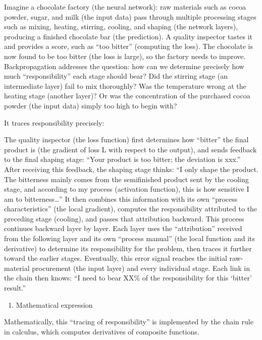 Imagine a chocolate factory (the neural network): raw materials such as cocoa powder, sugar, and milk (the input data) pass through multiple processing stages such as mixing, heating, stirring, cooling, and shaping (the network layers), producing a finished chocolate bar (the prediction). A quality inspector tastes it and provides a score, such as ``too bitter'' (computing the loss). The chocolate is now found to be too bitter (the loss is large), so the factory needs to improve. Backpropagation addresses the question: how can we determine precisely how much ``responsibility'' each stage should bear? Did the stirring stage (an intermediate layer) fail to mix thoroughly? Was the temperature wrong at the heating stage (another layer)? Or was the concentration of the purchased cocoa powder (the input data) simply too high to begin with?

It traces responsibility precisely:

The quality inspector (the loss function) first determines how ``bitter'' the final product is (the gradient of loss L with respect to the output), and sends feedback to the final shaping stage: ``Your product is too bitter; the deviation is xxx.'' After receiving this feedback, the shaping stage thinks: ``I only shape the product. The bitterness mainly comes from the semifinished product sent by the cooling stage, and according to my process (activation function), this is how sensitive I am to bitterness\ldots{}'' It then combines this information with its own ``process characteristics'' (the local gradient), computes the responsibility attributed to the preceding stage (cooling), and passes that attribution backward. This process continues backward layer by layer. Each layer uses the ``attribution'' received from the following layer and its own ``process manual'' (the local function and its derivative) to determine its responsibility for the problem, then traces it further toward the earlier stages. Eventually, this error signal reaches the initial raw-material procurement (the input layer) and every individual stage. Each link in the chain then knows: ``I need to bear XX\% of the responsibility for this `bitter' result.''

\begin{enumerate}
\def\labelenumi{\arabic{enumi}.}
\setcounter{enumi}{1}
\tightlist
\item
  Mathematical expression
\end{enumerate}

Mathematically, this ``tracing of responsibility'' is implemented by the chain rule in calculus, which computes derivatives of composite functions.

